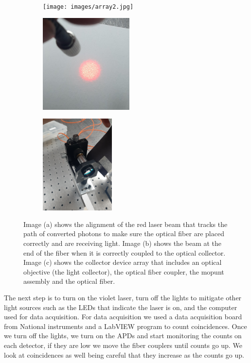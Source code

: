 \documentclass[12pt]{book}
\begin{document}
\begin{figure}[t!]
\centering
\begin{subfigure}[b]{0.3\linewidth}
\texttt{[image: images/array2.jpg]}
\label{outiea}
\caption{}
\end{subfigure}
\begin{subfigure}[b]{0.3\linewidth}
\includegraphics[width=\linewidth,height=5cm]{images/outfibre.jpg}
\label{outie}
\caption{}
\end{subfigure}
\begin{subfigure}[b]{0.3\linewidth}
\includegraphics[width=\linewidth,height=5cm]{images/fibre.jpg}
\label{outieb}
\caption{}
\end{subfigure}
\caption{Image (a) shows the alignment of the red laser beam that tracks the path of converted photons to make sure the optical fiber are placed correctly and are receiving light. Image (b) shows the  beam at the end of the fiber when it is correctly coupled to the optical collector. Image (c) shows the collector device array that includes  an optical objective (the light collector), the optical fiber coupler, the mopunt assembly and the optical fiber.}
\label{fig:coupler}
\end{figure}

The next step is to turn on the violet laser, turn off the lights to mitigate other light sources such as the LEDs that indicate the laser is on, and the computer used for data acquisition. For data acquisition we used a data acquisition board from National instruments and a LabVIEW program to count coincidences. Once we turn off the lights, we turn on the APDs and start monitoring the counts on each detector, if they are low we move the fiber couplers until counts go up. We look at coincidences as well being careful that they increase as the counts go up.
\end{document}
